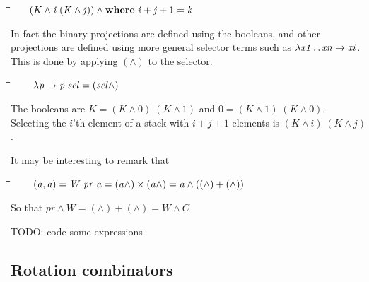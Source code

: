 \documentclass{article}
\newlength{\lwidth}\setlength{\lwidth}{4.5cm}
\newlength{\cwidth}\setlength{\cwidth}{8mm} %
\newcommand{\Conid}[1]{\mathit{#1}}
\newcommand{\Varid}[1]{\mathit{#1}}
\begin{document}
\begin{tabbing}
\qquad\=\hspace{\lwidth}\=\hspace{\cwidth}\=\+\kill
${\hskip1.50em\relax(\Conid{K}\wedge\Varid{i}\;(\Conid{K}\wedge\Varid{j}))\wedge\mathbf{where}\;\Varid{i}\mathbin{+}\Varid{j}\mathbin{+}\mathrm{1}\mathrel{=}\Varid{k}}$
\end{tabbing}
In fact the binary projections are defined using the booleans,
and other projections are defined using 
more general selector terms such as \ensuremath{\lambda \Varid{x1}\mathinner{\ldotp\ldotp}\Varid{xn}\to \Varid{xi}}.
This is done by applying \ensuremath{(\wedge)} to the selector. 

\begin{tabbing}
\qquad\=\hspace{\lwidth}\=\hspace{\cwidth}\=\+\kill
${\hskip1.50em\relax\phantom{(\mbox{}}\lambda \Varid{p}\to \Varid{p}\;\Varid{sel}\mathrel{=}(\Varid{sel}\wedge)}$
\end{tabbing}
The booleans are \ensuremath{\Conid{K}\mathrel{=}(\Conid{K}\wedge\mathrm{0})\;(\Conid{K}\wedge\mathrm{1})} and \ensuremath{\mathrm{0}\mathrel{=}(\Conid{K}\wedge\mathrm{1})\;(\Conid{K}\wedge\mathrm{0})}.  
Selecting the \ensuremath{\Varid{i}}'th element of a stack with \ensuremath{\Varid{i}\mathbin{+}\Varid{j}\mathbin{+}\mathrm{1}} elements is \ensuremath{(\Conid{K}\wedge\Varid{i})\;(\Conid{K}\wedge\Varid{j})}. 

It may be interesting to remark that
\begin{tabbing}
\qquad\=\hspace{\lwidth}\=\hspace{\cwidth}\=\+\kill
${\hskip1.50em\relax\phantom{(\mbox{}}(\Varid{a},\Varid{a})\mathrel{=}\Conid{W}\;\Varid{pr}\;\Varid{a}\mathrel{=}(\Varid{a}\wedge)\times(\Varid{a}\wedge)\mathrel{=}\Varid{a}\wedge((\wedge)\mathbin{+}(\wedge))}$
\end{tabbing}So that \ensuremath{\Varid{pr}\wedge\Conid{W}\mathrel{=}(\wedge)\mathbin{+}(\wedge)\mathrel{=}\Conid{W}\wedge\Conid{C}} 

TODO: code some expressions


\subsection{Rotation combinators}
\end{document}
